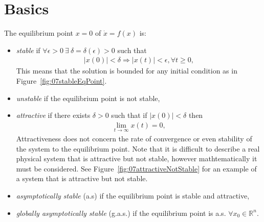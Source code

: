 
\mainmatter%
\setcounter{page}{1}

\lectureseries[\course]{\course}

\date{January 26, 2010}

\setaddress%

\setcounter{lecture}{6}
\setcounter{chapter}{6}


\section{Basics}
\begin{definition}
The equilibrium point $x=0$ of $\dot{x}=f(x)$ is:
\begin{itemize}
\item \textit{stable} if $\forall \epsilon > 0~\exists~\delta=\delta(\epsilon)>0$ such that
\begin{align*}
|x(0)| < \delta \Rightarrow |x(t)| < \epsilon, \forall t\geq0,
\end{align*}
This means that the solution is bounded for any initial condition as in Figure~\ref{fig:07stableEqPoint}.
\item \textit{unstable} if the equilibrium point is not stable,
\item \textit{attractive} if there exists $\delta>0$ such that if $|x(0)|<\delta$ then
\begin{align*}
\lim_{t\to\infty}x(t) = 0,
\end{align*}
Attractiveness does not concern the rate of convergence or even stability of the system to the equilibrium point. Note that it is difficult to describe a real physical system that is attractive but not stable, however mathtematically it must be considered. See Figure~\ref{fig:07attractiveNotStable} for an example of a system that is attractive but not stable.
\item \textit{asymptotically stable} (a.s) if the equilibrium point is stable and attractive,
\item \textit{globally asymptotically stable} (g.a.s.) if the equilibrium point is a.s. $\forall x_0\in\mathbb{R}^n$.
\end{itemize}
\end{definition}

